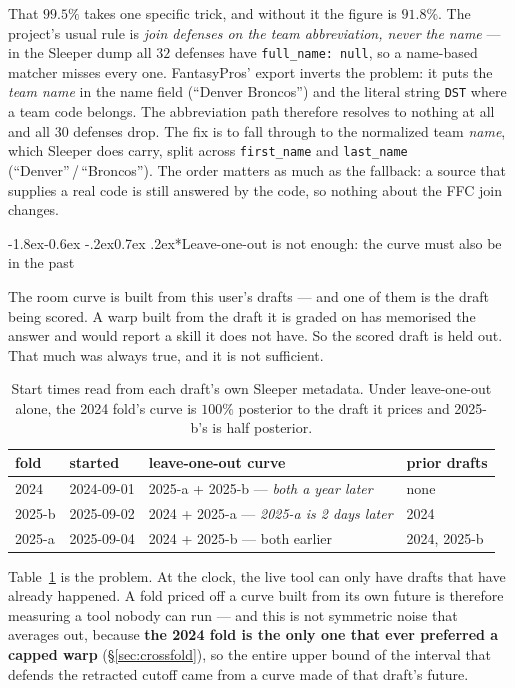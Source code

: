 \documentclass[10pt,a4paper]{article}
\makeatletter
\theoremstyle{plain}
\theoremstyle{definition}
\theoremstyle{remark}
\newcommand{\code}[1]{\texttt{\small #1}}
\renewcommand\subsubsection{\@startsection{subsubsection}{3}{\z@}%
  {-1.8ex\@plus -0.6ex \@minus -.2ex}{0.7ex \@plus .2ex}{\normalfont\normalsize\bfseries}}
\makeatother
\begin{document}
That $99.5\%$ takes one specific trick, and without it the figure is $91.8\%$. The
project's usual rule is \emph{join defenses on the team abbreviation, never the name} ---
in the Sleeper dump all $32$ defenses have \code{full\_name: null}, so a name-based matcher
misses every one. FantasyPros' export inverts the problem: it puts the \emph{team name}
in the name field (``Denver Broncos'') and the literal string \code{DST} where a team code
belongs. The abbreviation path therefore resolves to nothing at all and all $30$ defenses
drop. The fix is to fall through to the normalized team \emph{name}, which Sleeper does
carry, split across \code{first\_name} and \code{last\_name} (``Denver''\,/\,``Broncos'').
The order matters as much as the fallback: a source that supplies a real code is still
answered by the code, so nothing about the FFC join changes.

\subsubsection*{Leave-one-out is not enough: the curve must also be in the past}
\label{sec:causal}

The room curve is built from this user's drafts --- and one of them is the draft being
scored. A warp built from the draft it is graded on has memorised the answer and would
report a skill it does not have. So the scored draft is held out. That much was always
true, and it is not sufficient.

\begin{table}[htbp]
\centering
\small
\begin{tabular}{llll}
\toprule
fold & started & leave-one-out curve & prior drafts \\
\midrule
2024   & 2024-09-01 & 2025-a + 2025-b --- \emph{both a year later} & none \\
2025-b & 2025-09-02 & 2024 + 2025-a --- \emph{2025-a is 2 days later} & 2024 \\
2025-a & 2025-09-04 & 2024 + 2025-b --- both earlier & 2024, 2025-b \\
\bottomrule
\end{tabular}
\caption{Start times read from each draft's own Sleeper metadata. Under leave-one-out
alone, the 2024 fold's curve is $100\%$ posterior to the draft it prices and 2025-b's is
half posterior.}
\label{tab:causal}
\end{table}

Table~\ref{tab:causal} is the problem. At the clock, the live tool can only have drafts
that have already happened. A fold priced off a curve built from its own future is
therefore measuring a tool nobody can run --- and this is not symmetric noise that averages
out, because \textbf{the 2024 fold is the only one that ever preferred a capped warp}
(\S\ref{sec:crossfold}), so the entire upper bound of the interval that defends
the retracted cutoff came from a curve made of that draft's future.
\end{document}
